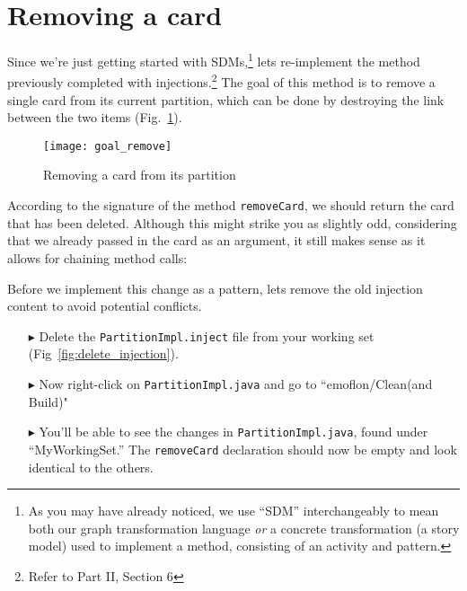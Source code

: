 \newpage
\genHeader
\section{Removing a card}
\hypertarget{sec:remCard}{}

Since we're just getting started with SDMs,\footnote{As you may have already noticed, we use ``SDM'' interchangeably to mean both our graph transformation
language \emph{or} a concrete transformation (a story model) used to implement a method, consisting of an activity and pattern.} lets re-implement the method
previously completed with injections.\footnote{Refer to Part II, Section 6} The goal of this method is to remove a single card from its current partition, which
can be done by destroying the link between the two items (Fig.~\ref{fig:goal_removeCard}).

\vspace{1cm}

\begin{figure}[htbp]
	\centering
    \texttt{[image: goal\_remove]}
	\caption{Removing a card from its partition}
	\label{fig:goal_removeCard}
\end{figure}
\FloatBarrier

\vspace{0.5cm}

According to the signature of the method \texttt{removeCard}, we should return the card that has been deleted. Although this might strike you as slightly odd,
considering that we already passed in the card as an argument, it still makes sense as it allows for chaining method calls:

Before we implement this change as a pattern, lets remove the old injection content to avoid potential conflicts.

\begin{itemize}

\item[$\blacktriangleright$] Delete the \texttt{PartitionImpl.inject} file from your working set (Fig~\ref{fig:delete_injection}).

\item[$\blacktriangleright$] Now right-click on \texttt{PartitionImpl.java} and go to ``emoflon/Clean(and Build)" 

\item[$\blacktriangleright$] You'll be able to see the changes in \texttt{PartitionImpl.java}, found under ``MyWorkingSet.'' The \texttt{removeCard}
declaration should now be empty and look identical to the others.

\end{itemize}

